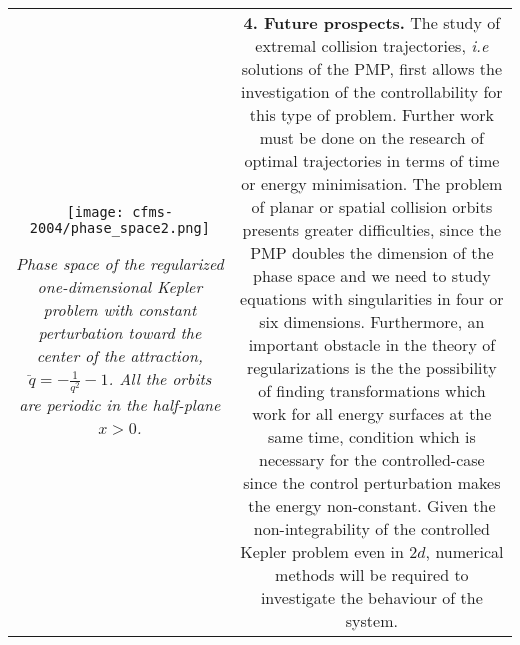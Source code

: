 \documentclass[10pt,a4paper]{article}
\def\noi{\noindent}
\theoremstyle{definition}
\begin{document}
\noi \vspace*{4mm} \begin{tabular}{cc}
\begin{minipage}[b]{7.0cm} \vspace*{0.3cm} \footnotesize
\begin{center} \centering \texttt{[image: cfms-2004/phase\_space2.png]}
\end{center}
\emph{Phase space of the regularized one-dimensional Kepler problem with constant perturbation toward the center of the attraction, $\ddot q = -\frac{1}{q^2} -1$. All the orbits are periodic in the half-plane $x>0$.}
\end{minipage} &
\begin{minipage}[b]{11.42cm} \vspace*{-1cm} \footnotesize
\noi \textbf{4. Future prospects.}
The study of extremal collision trajectories, \textit{i.e} solutions of the PMP, first allows the investigation of the controllability for this type of problem. Further work must be done on the research of optimal trajectories in terms of time or energy minimisation. The problem of planar or spatial collision orbits presents greater difficulties, since the PMP doubles the dimension of the phase space and we need to study equations with singularities in four or six dimensions. Furthermore, an important obstacle in the  theory of regularizations is the the possibility of finding transformations which work for all energy surfaces at the same time, condition which is necessary for the controlled-case since the control perturbation makes the energy non-constant. Given the non-integrability of the controlled Kepler problem even in $2d$, numerical methods will be required to investigate the behaviour of the system.
\end{minipage}\\
\end{tabular}
\end{document}
